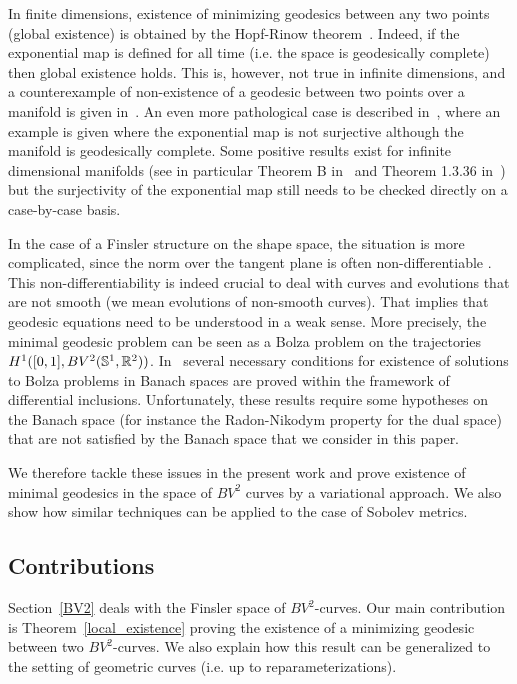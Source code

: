 In finite dimensions, existence of minimizing geodesics between any two points (global existence) is obtained by the Hopf-Rinow theorem~\cite{HR}. Indeed, if the exponential map is defined for all time (i.e. the space is geodesically complete) then global existence holds. This is, however, not true in infinite dimensions, and a counterexample of non-existence of a geodesic between two points over a manifold is given in~\cite{MR0188943}. An even more pathological case is described in~\cite{MR0400283}, where an example is given where the exponential map is not surjective although the manifold is geodesically complete.
Some positive results exist for infinite dimensional manifolds (see in particular Theorem B in~\cite{Ekland} and Theorem 1.3.36 in~\cite{Mennucci-CIME}) but the surjectivity of the exponential map still needs to be checked directly on a case-by-case basis. 

In the case of a Finsler structure on the shape space, the situation is more complicated, since the norm over the tangent plane is often non-differentiable . This non-differentiability is indeed crucial to deal with curves and evolutions that are not smooth (we mean evolutions of non-smooth curves). That implies that geodesic equations need to be understood in a weak sense. More precisely, the minimal geodesic problem can be seen as a Bolza problem on the trajectories $H^1([0,1],BV^2(\mathbb{S}^1,\mathbb{R}^2))$. In~\cite{Mord} several necessary conditions for existence of solutions to Bolza problems in Banach spaces are proved within the framework of differential inclusions. Unfortunately, these results require some hypotheses on the Banach space (for instance the Radon-Nikodym property for the dual space) that are not satisfied by the Banach space that we consider in this paper. 

We therefore tackle these issues in the present work and prove  existence of minimal geodesics in the space of $BV^2$ curves by a variational approach. We also show how similar techniques can be applied to the case of Sobolev metrics. 


\subsection{Contributions}

Section~\ref{BV2} deals with the Finsler space of $BV^2$-curves. Our main contribution is Theorem~\ref{local_existence}  proving the existence of a minimizing geodesic between two $BV^2$-curves. We also explain how this result can be generalized to the setting of geometric curves (i.e. up to reparameterizations).

